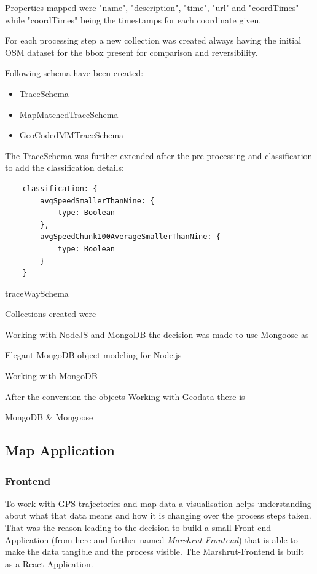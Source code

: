 Properties mapped were "name", "description", "time", "url" and "coordTimes" while "coordTimes" being the timestamps for each coordinate given. 

For each processing step a new collection was created always having the initial OSM dataset for the bbox present for comparison and reversibility. 

Following schema have been created: 

\begin{itemize}
	\item TraceSchema
 	\item MapMatchedTraceSchema
 	\item GeoCodedMMTraceSchema
\end{itemize}

The TraceSchema was further extended after the pre-processing and classification to add the classification details:

\begin{lstlisting}
    classification: {
        avgSpeedSmallerThanNine: {
            type: Boolean
        },
        avgSpeedChunk100AverageSmallerThanNine: {
            type: Boolean
        }
    }
\end{lstlisting}



traceWaySchema

Collections created were 

Working with NodeJS and MongoDB the decision was made to use Mongoose as

Elegant MongoDB object modeling for Node.js


Working with MongoDB 

After the conversion the objects 
Working with Geodata there is 





MongoDB & Mongoose

\subsection{Map Application}

\subsubsection{Frontend}

To work with GPS trajectories and map data a visualisation helps understanding about what that data means and how it is changing over the process steps taken. That was the reason leading to the decision to build a small Front-end Application (from here and further named \textit{Marshrut-Frontend}) that is able to make the data tangible and the process visible. The Marshrut-Frontend is built as a React Application.

